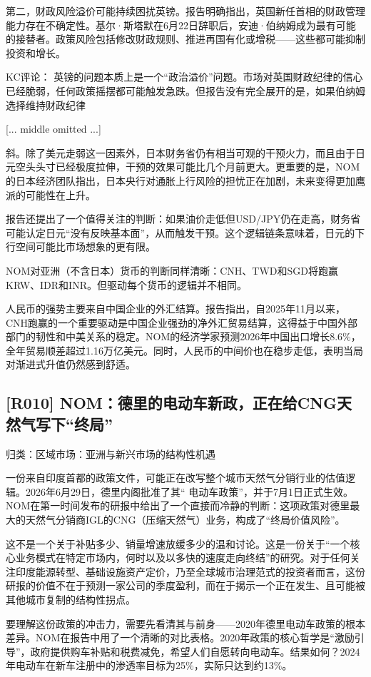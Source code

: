 \documentclass[11pt]{ctexart}
\begin{document}
第二，财政风险溢价可能持续困扰英镑。报告明确指出，英国新任首相的财政管理能力存在不确定性。基尔·斯塔默在6月22日辞职后，安迪·伯纳姆成为最有可能的接替者。政策风险包括修改财政规则、推进再国有化或增税——这些都可能抑制投资和增长。

KC评论： 英镑的问题本质上是一个“政治溢价”问题。市场对英国财政纪律的信心已经脆弱，任何政策摇摆都可能触发急跌。但报告没有完全展开的是，如果伯纳姆选择维持财政纪律

[... middle omitted ...]

斜。除了美元走弱这一因素外，日本财务省仍有相当可观的干预火力，而且由于日元空头头寸已经极度拉伸，干预的效果可能比几个月前更大。更重要的是，NOM的日本经济团队指出，日本央行对通胀上行风险的担忧正在加剧，未来变得更加鹰派的可能性在上升。

报告还提出了一个值得关注的判断：如果油价走低但USD/JPY仍在走高，财务省可能认定日元“没有反映基本面”，从而触发干预。这个逻辑链条意味着，日元的下行空间可能比市场想象的更有限。

NOM对亚洲（不含日本）货币的判断同样清晰：CNH、TWD和SGD将跑赢KRW、IDR和INR。但驱动每个货币的逻辑并不相同。

人民币的强势主要来自中国企业的外汇结算。报告指出，自2025年11月以来，CNH跑赢的一个重要驱动是中国企业强劲的净外汇贸易结算，这得益于中国外部部门的韧性和中美关系的稳定。NOM的经济学家预测2026年中国出口增长8.6\%，全年贸易顺差超过1.16万亿美元。同时，人民币的中间价也在稳步走低，表明当局对渐进式升值仍然感到舒适。

\subsection{[R010] NOM：德里的电动车新政，正在给CNG天然气写下“终局”}
{\small\color{refgray}归类：区域市场：亚洲与新兴市场的结构性机遇}

一份来自印度首都的政策文件，可能正在改写整个城市天然气分销行业的估值逻辑。2026年6月29日，德里内阁批准了其“ 电动车政策”，并于7月1日正式生效。NOM在第一时间发布的研报中给出了一个直接而冷静的判断：这项政策对德里最大的天然气分销商IGL的CNG（压缩天然气）业务，构成了“终局价值风险”。

这不是一个关于补贴多少、销量增速放缓多少的温和讨论。这是一份关于“一个核心业务模式在特定市场内，何时以及以多快的速度走向终结”的研究。对于任何关注印度能源转型、基础设施资产定价，乃至全球城市治理范式的投资者而言，这份研报的价值不在于预测一家公司的季度盈利，而在于揭示一个正在发生、且可能被其他城市复制的结构性拐点。

要理解这份政策的冲击力，需要先看清其与前身——2020年德里电动车政策的根本差异。NOM在报告中用了一个清晰的对比表格。2020年政策的核心哲学是“激励引导”，政府提供购车补贴和税费减免，希望人们自愿转向电动车。结果如何？2024年电动车在新车注册中的渗透率目标为25\%，实际只达到约13\%。
\end{document}
